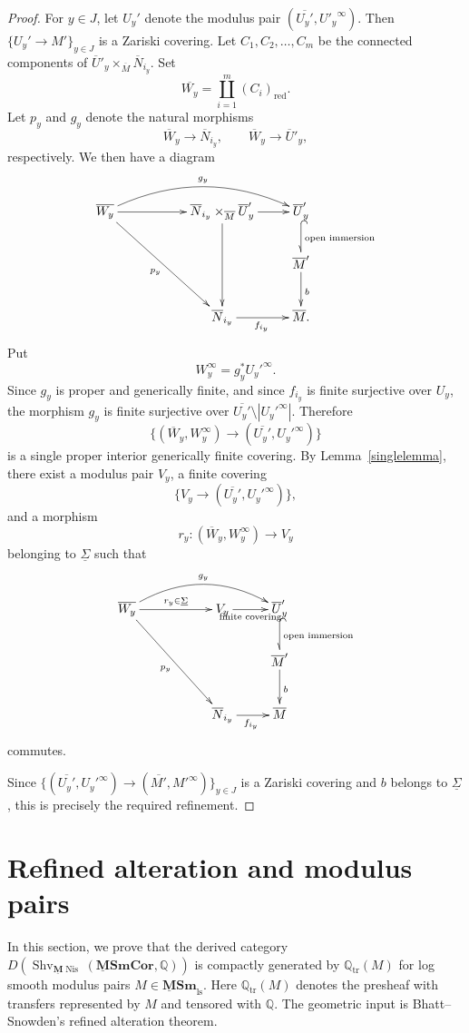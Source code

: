 \documentclass[11pt]{amsart}
\newcommand{\Q}{\mathbb{Q}}
\newcommand{\Shv}{{\operatorname{Shv}}}
\newcommand{\ul}[1]{{\underline{#1}}}
\newcommand{\tr}{{\operatorname{tr}}}
\newcommand{\red}{{\operatorname{red}}}
\newcommand{\Nis}{{\operatorname{Nis}}}
\newcommand{\ol}{\overline}
\newcommand{\M}{\mathbf{M}}
\newcommand{\ulM}{\underline{\M}}
\newcommand{\ulMSm}{\operatorname{\mathbf{\underline{M}Sm}}}
\newcommand{\ulMSmCor}{\operatorname{\mathbf{\underline{M}SmCor}}}
\newcommand{\ulMSmls}{{\ulMSm}_{\text{ls}}}
\newcounter{spec}
\theoremstyle{definition}
\theoremstyle{remark}
\numberwithin{equation}{section}
\begin{document}
\begin{proof}
For $y\in J$, let $U_y'$ denote the modulus pair $(\ol{U_y'},{U'_y}^\infty)$. Then $\{U_y' \to M' \}_{y \in J}$ is a Zariski covering. Let $C_1,C_2,\dots,C_m$ be the connected components of $\ol{U}'_y\times_{\ol{M}}\ol{N}_{i_y}$. Set
\[
\ol{W_y}=\coprod_{i=1}^m (C_i)_{\red}.
\]
Let $p_{y}$ and $g_y$ denote the natural morphisms
\[
\ol{W}_y \to \ol{N}_{i_y}, \qquad \ol{W}_y \to \ol{U}'_{y},
\]
respectively. We then have a diagram
\[
\xymatrix{
\ol{W_y}\ar[rrdd]_{p_y}\ar[rr] \ar@/^20pt/[rrr]^{g_y} && \ol{N}_{i_y} \times_{\ol{M}} \ol{U}_y'  \ar[dd] \ar[r]&\ol{U}_y'\ar@{^{(}-_>}[d]^{\text{open immersion}}\\
&&&\ol{M}' \ar[d]^{b}\\
&& \ol{N}_{i_y} \ar[r]_{f_{i_y}} & \ol{M}.
}
\]
Put
\[
W_y^\infty = g_y^* {U_y'}^\infty.
\]
Since $g_y$ is proper and generically finite, and since $f_{i_y}$ is finite surjective over $U_y$, the morphism $g_y$ is finite surjective over $\ol{U_y'}\setminus |{U_y'}^\infty|$. Therefore
\[
\{(\ol{W}_{y},W_y^\infty) \to (\ol{U_y'},{U_y'}^\infty )\}
\]
is a single proper interior generically finite covering. By Lemma~\ref{singlelemma}, there exist a modulus pair $V_y$, a finite covering
\[
\{V_y \to (\ol{U_y'},{U_y'}^\infty )\},
\]
and a morphism
\[
r_y:(\ol{W}_{y},W_y^\infty) \to V_y
\]
belonging to $\ul{\Sigma}$ such that
\[
\xymatrix{
\ol{W_y}\ar[rrdd]_{p_y}\ar[rr]^-{{r_y \in \ul{\Sigma}}} \ar@/^20pt/[rrr]^{g_y} && V_y  \ar[r]_-{\text{finite covering}} &\ol{U}_y'\ar@{^{(}-_>}[d]^{\text{open immersion}}\\
&&&\ol{M}' \ar[d]^{b}\\
&& \ol{N}_{i_y} \ar[r]_{f_{i_y}} & \ol{M}
}
\]
commutes.

Since $\{(\ol{U_y'}, {U_y'}^\infty) \to (\ol{M'},M'^\infty)\}_{y\in J}$ is a Zariski covering and $b$ belongs to $\ul{\Sigma}$, this is precisely the required refinement.
\end{proof}

\section{Refined alteration and modulus pairs}\label{section3}

In this section, we prove that the derived category $D(\Shv_{\ulM \Nis}(\ulMSmCor,\Q))$ is compactly generated by $\Q_\tr(M)$ for log smooth modulus pairs $M \in \ulMSmls$. Here $\Q_\tr(M)$ denotes the presheaf with transfers represented by $M$ and tensored with $\Q$. The geometric input is Bhatt--Snowden's refined alteration theorem.
\end{document}
